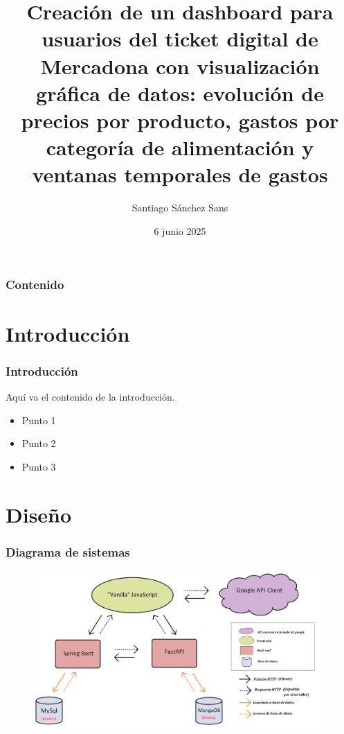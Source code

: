 \documentclass{beamer}
\title[Creación de un dashboard para usuarios del ticket digital de Mercadona]{Creación de un dashboard para usuarios del ticket digital de Mercadona con visualización gráfica de datos: evolución de precios por producto, gastos por categoría de alimentación y ventanas temporales de gastos}
\author{Santiago Sánchez Sans}
\institute{IES Abastos}
\date{6 junio 2025} %
\begin{document}
	
	\begin{frame}
		\titlepage
	\end{frame}
	
	\begin{frame}
		\frametitle{Contenido}
		\tableofcontents
	\end{frame}
	
	\section{Introducción}
	
	\begin{frame}
		\frametitle{Introducción}
		Aquí va el contenido de la introducción.
		\begin{itemize}
			\item Punto 1
			\item Punto 2
			\item Punto 3
		\end{itemize}
	\end{frame}
	
	\section{Diseño}
	
	
	\begin{frame}
		\frametitle{Diagrama de sistemas}
		 

		\begin{figure}
			\centering
			\includegraphics[width=1\linewidth]{../img/diagramaSistemesAplicacioMercapp}
			
			\label{fig:diagramasistemesaplicaciomercapp}
		\end{figure}
		
	\end{frame}
	
\end{document}

